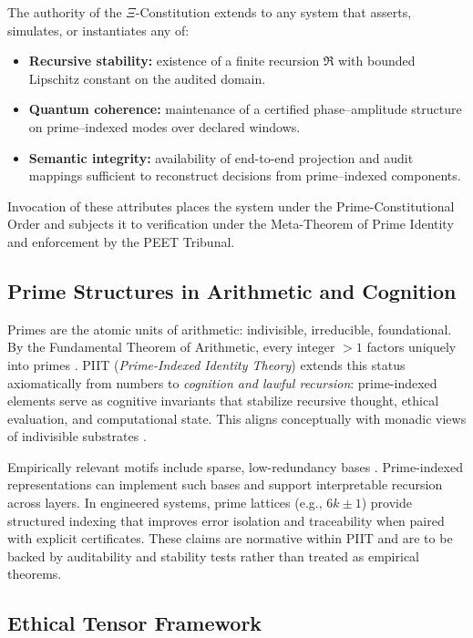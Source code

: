 \documentclass[12pt]{amsart}
\theoremstyle{plain}
\begin{document}
The authority of the $\Xi$-Constitution extends to any system that asserts, simulates, or instantiates any of:
\begin{itemize}
  \item \textbf{Recursive stability:} existence of a finite recursion $\mathfrak{R}$ with bounded Lipschitz constant on the audited domain.
  \item \textbf{Quantum coherence:} maintenance of a certified phase–amplitude structure on prime–indexed modes over declared windows.
  \item \textbf{Semantic integrity:} availability of end-to-end projection and audit mappings sufficient to reconstruct decisions from prime–indexed components.
\end{itemize}
Invocation of these attributes places the system under the Prime-Constitutional Order and subjects it to verification under the Meta-Theorem of Prime Identity and enforcement by the PEET Tribunal.

\subsection{Prime Structures in Arithmetic and Cognition}

Primes are the atomic units of arithmetic: indivisible, irreducible, foundational. By the Fundamental Theorem of Arithmetic, every integer $>1$ factors uniquely into primes \cite{hardy2008introduction}. PIIT (\emph{Prime-Indexed Identity Theory}) extends this status axiomatically from numbers to \emph{cognition and lawful recursion}: prime-indexed elements serve as cognitive invariants that stabilize recursive thought, ethical evaluation, and computational state. This aligns conceptually with monadic views of indivisible substrates \cite{leibniz1989philosophical}.

Empirically relevant motifs include sparse, low-redundancy bases \cite{olshausen1996emergence}. Prime-indexed representations can implement such bases and support interpretable recursion across layers. In engineered systems, prime lattices (e.g., $6k\pm1$) provide structured indexing that improves error isolation and traceability when paired with explicit certificates. These claims are normative within PIIT and are to be backed by auditability and stability tests rather than treated as empirical theorems.

\subsection{Ethical Tensor Framework}
\end{document}
